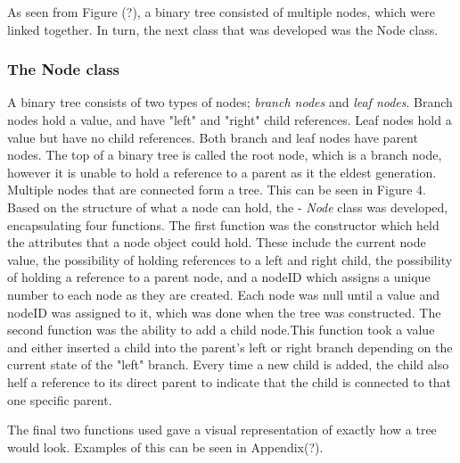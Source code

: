 \documentclass[11pt]{article}
\begin{document}
As seen from Figure (?), a binary tree consisted of multiple nodes, which were linked together. In turn, the next class that was developed was the Node class. 
\subsubsection{The Node class}
 A binary tree consists of two types of nodes; \textit{branch nodes} and \textit{leaf nodes}. Branch nodes hold a value, and have "left" and "right" child references. Leaf nodes hold a value but have no child references. Both branch and leaf nodes have parent nodes. The top of a binary tree is called the root node, which is a branch node, however it is unable to hold a reference to a parent as it the eldest generation. Multiple nodes that are connected form a tree. This can be seen in Figure 4.  \\
Based on the structure of what a node can hold, the - \textit{Node} class was developed, encapsulating four functions. The first function was the constructor which held the attributes that a node object could hold. These include the current node value, the possibility of holding references to a left and right child, the possibility of holding a reference to a parent node, and a nodeID which assigns a unique number to each node as they are created.
Each node was null until a value and nodeID was assigned to it, which was done when the tree was constructed. The second function was the ability to add a child node.This function took a value and either inserted a child into the parent's left or right branch depending on the current state of the "left" branch. Every time a new child is added, the child also helf a reference to its direct parent to indicate that the child is connected to that one specific parent.
 
The final two functions used gave a visual representation of exactly how a tree would look. Examples of this can be seen in Appendix(?). 
\end{document}
